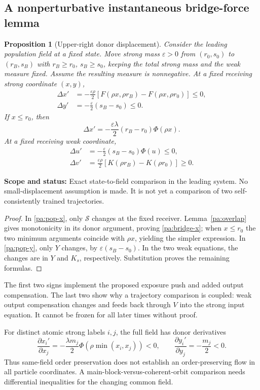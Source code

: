 \documentclass[11pt]{article}
\numberwithin{equation}{section}
\newtheorem{proposition}{Proposition}[section]
\theoremstyle{definition}
\theoremstyle{remark}
\newcommand{\1}{\mathbf 1}
\newcommand{\scope}[1]{\par\noindent\textbf{Scope and status:} #1\par\smallskip}
\begin{document}
\subsection{A nonperturbative instantaneous bridge-force lemma}
\label{pa:bridge}
\begin{proposition}[Upper-right donor displacement]\label{pa:bridge-force}
Consider the leading population field at a fixed state. Move strong mass
$\varepsilon>0$ from $(r_0,s_0)$ to $(r_B,s_B)$ with
$r_B\ge r_0$, $s_B\ge s_0$, keeping the total strong mass and the weak
measure fixed. Assume the resulting measure is nonnegative. At a fixed
receiving strong coordinate $(x,y)$,
\begin{align}
 \Delta x'&=-\frac{\varepsilon\rho}{2}
 [F(\rho x,\rho r_B)-F(\rho x,\rho r_0)]\le0,\label{pa:bridge-x}\\
 \Delta y'&=-\frac\varepsilon2(s_B-s_0)\le0.\label{pa:bridge-y}
\end{align}
If $x\le r_0$, then
\[
 \Delta x'=-\frac{\varepsilon\lambda}{2}(r_B-r_0)\Phi(\rho x).
\]
At a fixed receiving weak coordinate,
\begin{align}
 \Delta u'&=-\frac\varepsilon2(s_B-s_0)\Phi(u)\le0,\label{pa:bridge-u}\\
 \Delta v'&=\frac{\varepsilon\rho}{2}
 [K(\rho r_B)-K(\rho r_0)]\ge0.\label{pa:bridge-v}
\end{align}
\end{proposition}
\scope{Exact state-to-field comparison in the leading system. No
small-displacement assumption is made. It is not yet a comparison of two
self-consistently trained trajectories.}
\begin{proof}
In \eqref{pa:pop-x}, only $\mathcal S$ changes at the fixed receiver.
Lemma~\ref{pa:overlap} gives monotonicity in its donor argument, proving
\eqref{pa:bridge-x}; when $x\le r_0$ the two minimum arguments coincide
with $\rho x$, yielding the simpler expression. In \eqref{pa:pop-y},
only $Y$ changes, by $\varepsilon(s_B-s_0)$. In the two weak equations,
the changes are in $Y$ and $K_s$, respectively. Substitution proves the
remaining formulas.
\end{proof}
The first two signs implement the proposed exposure push and added output
compensation. The last two show why a trajectory comparison is coupled:
weak output compensation changes and feeds back through $V$ into the
strong input equation. It cannot be frozen for all later times without proof.

For distinct atomic strong labels $i,j$, the full field has donor derivatives
\begin{equation}\label{pa:donor-negative}
 \frac{\partial x_i'}{\partial x_j}
 =-\frac{\lambda m_j}{2}\Phi(\rho\min(x_i,x_j))<0,
 \qquad
 \frac{\partial y_i'}{\partial y_j}=-\frac{m_j}{2}<0.
\end{equation}
Thus same-field order preservation does not establish an order-preserving
flow in all particle coordinates. A main-block-versus-coherent-orbit
comparison needs differential inequalities for the changing common field.
\end{document}
